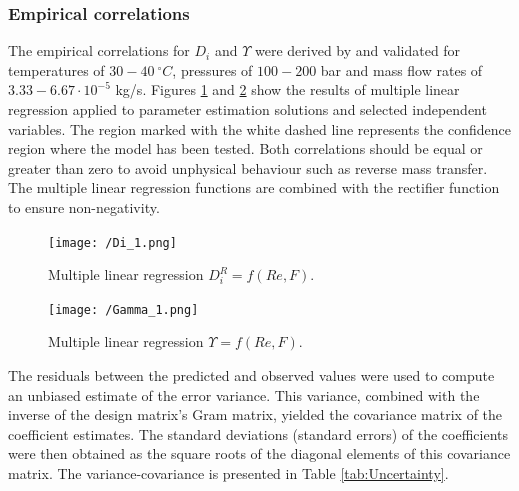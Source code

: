 \documentclass[a4paper,fleqn]{cas-dc}
\begin{document}
		\subsubsection{Empirical correlations}
		
		The empirical correlations for $D_i$ and $\Upsilon$ were derived by \citet{Sliczniuk2024} and validated for temperatures of $30 - 40~^\circ C$, pressures of $100 - 200$ bar and mass flow rates of $3.33-6.67 \cdot 10^{-5}$ kg/s. Figures \ref{fig:Correlation_Di} and \ref{fig:Correlation_Gamma} show the results of multiple linear regression applied to parameter estimation solutions and selected independent variables. The region marked with the white dashed line represents the confidence region where the model has been tested. Both correlations should be equal or greater than zero to avoid unphysical behaviour such as reverse mass transfer. The multiple linear regression functions are combined with the rectifier function to ensure non-negativity.
		
		\begin{figure}[!ht]
			\centering
			\texttt{[image: /Di\_1.png]}
			\caption{Multiple linear regression $D_i^R = f(Re, F)$.}
			\label{fig:Correlation_Di}
		\end{figure}
		
		\begin{figure}[!ht]
			\centering
			\texttt{[image: /Gamma\_1.png]}
			\caption{Multiple linear regression $\Upsilon = f(Re, F)$.}
			\label{fig:Correlation_Gamma}
		\end{figure}
		
		The residuals between the predicted and observed values were used to compute an unbiased estimate of the error variance. This variance, combined with the inverse of the design matrix's Gram matrix, yielded the covariance matrix of the coefficient estimates. The standard deviations (standard errors) of the coefficients were then obtained as the square roots of the diagonal elements of this covariance matrix. The variance-covariance is presented in Table \ref{tab:Uncertainty}.
		
\end{document}
